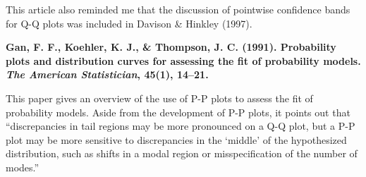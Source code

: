 \documentclass{article}
\begin{document}
This article also reminded me that the discussion of pointwise confidence bands for Q-Q plots was included in Davison \& Hinkley (1997).

\bigskip

{\bf Gan, F. F., Koehler, K. J., \& Thompson, J. C. (1991). Probability plots and distribution curves for assessing the fit of probability models. \emph{The American Statistician}, 45(1), 14--21.}

This paper gives an overview of the use of P-P plots to assess the fit of probability models. Aside from the development of P-P plots, it points out that ``discrepancies in tail regions may be more pronounced on a Q-Q plot, but a P-P plot may be more sensitive to discrepancies in the `middle' of the hypothesized distribution, such as shifts in a modal region or misspecification of the number of modes.''
\end{document}
